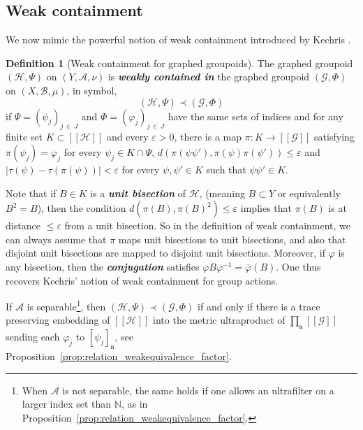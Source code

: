 \documentclass[10pt]{amsart}
\theoremstyle{definition}
\newtheorem{defi}[cdrthm]{Definition}
\newcommand{\defin}[1]{\textbf{\emph{#1}}}
\newcommand{\Nmath}{\mathbb{N}}
\newcommand{\cH}{\mathcal{H}}
\newcommand{\ch}{\mathcal{H}}
\newcommand{\cg}{\mathcal{G}}
\newcommand{\ra}{\mathscr{A}}
\newcommand{\rb}{\mathscr{B}}
\newcommand{\ul}{\mathfrak{u}}
\newcommand{\eps}{\varepsilon}
\newcommand{\ph}{\varphi}
\newcommand*{\MK}{\mkern 2mu}
\begin{document}
\subsection{Weak containment}
We now mimic the powerful notion of weak containment introduced by Kechris \cite[Section~10$\MK$(C)]{Kechris-Global-aspects-2010}.

\begin{defi}[Weak containment for graphed groupoids]
The graphed groupoid $(\ch,\Psi)$ on $(Y,\ra, \nu)$ is
\defin{weakly contained in} the graphed groupoid $(\cg, \Phi)$ on $(X, \rb, \mu)$, in symbol,
\[
(\ch,\Psi) \prec (\cg, \Phi)
\]
if $\Psi=(\psi_j)_{j\,\in\,J}$ and $\Phi=(\ph_j)_{j\,\in\,J}$ have the same sets of indices and for any finite set $K \subset [[\cH]]$ and every $\eps>0$, there is a map $\pi \colon K \to [[\cg]]$ satisfying $\pi(\psi_j) = \ph_j$ for every $\psi_j \in K \cap \Psi$, $d(\pi(\psi\psi'),\pi(\psi)\pi(\psi')) \leq \eps$ and $|\tau(\psi) - \tau(\pi(\psi))|<\eps$ for every $\psi,\psi' \in K$ such that $\psi\psi' \in K$.
\end{defi}

Note that if $B \in K$ is a \defin{unit bisection} of $\ch$, (meaning $B \subset Y$ or equivalently $B^2=B$), then the condition $d(\pi(B),\pi(B)^2) \leq \eps$ implies that $\pi(B)$ is at distance $\leq \eps$ from a unit bisection. So in the definition of weak containment, we can always assume that $\pi$ maps unit bisections to unit bisections, and also that disjoint unit bisections are mapped to disjoint unit bisections. Moreover, if $\ph$ is any bisection, then the
\defin{conjugation} satisfies $\ph B \ph^{-1}=\overline{\ph}(B)$. One thus recovers Kechris' notion of weak containment for group actions.

If $\ra$ is separable\footnote{When $\ra$ is not separable, the same holds if one allows an ultrafilter on a larger index set than $\Nmath$, as in Proposition~\ref{prop:relation_weakequivalence_factor}.}, then $(\ch,\Psi) \prec (\cg, \Phi)$ if and only if there is a trace preserving embedding of $[[\ch]]$ into the metric ultraproduct of $\prod_\ul [[\cg]]$ sending each $\ph_j$ to $[\psi_j]_\ul$, see Proposition~\ref{prop:relation_weakequivalence_factor}.
\end{document}
